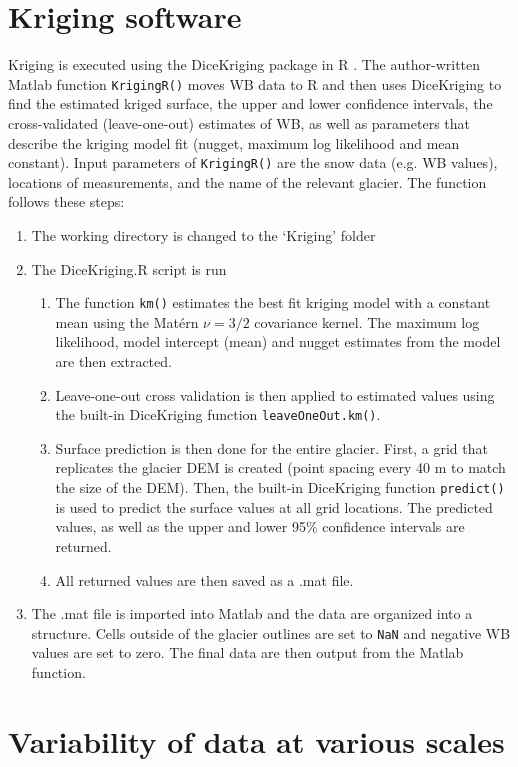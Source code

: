\documentclass{sfuthesis}
\begin{document}
\begin{appendices}
\chapter{Kriging software}
\label{app:KrigingMethods}
Kriging is executed using the DiceKriging package in R \citep{Roustant2012}. The author-written Matlab function \texttt{KrigingR()} moves WB data to R and then uses DiceKriging to find the estimated kriged surface, the upper and lower confidence intervals, the cross-validated (leave-one-out) estimates of WB, as well as parameters that describe the kriging model fit (nugget, maximum log likelihood and mean constant). Input parameters of  \texttt{KrigingR()} are the snow data (e.g. WB values), locations of measurements, and the name of the relevant glacier. The function follows these steps:
\begin{enumerate}
\item The working directory is changed to the `Kriging' folder
\item The DiceKriging.R script is run
	\begin{enumerate}
	\item The function \texttt{km()} estimates the best fit kriging model with a constant mean using the Mat\'ern $\nu = 3/2$ covariance kernel. The maximum log likelihood, model intercept (mean) and nugget estimates from the model are then extracted. 
	\item Leave-one-out cross validation is then applied to estimated values using the built-in DiceKriging function \texttt{leaveOneOut.km()}.
	\item Surface prediction is then done for the entire glacier. First, a grid that replicates the glacier DEM is created (point spacing every 40 m to match the size of the DEM). Then, the built-in DiceKriging function \texttt{predict()} is used to predict the surface values at all grid locations. The predicted values, as well as the upper and lower 95\% confidence intervals are returned. 
	\item All returned values are then saved as a .mat file.
	\end{enumerate}
\item The .mat file is imported into Matlab and the data are organized into a structure. Cells outside of the glacier outlines are set to \texttt{NaN} and negative WB values are set to zero. The final data are then output from the Matlab function. 
\end{enumerate}

\chapter{Variability of data at various scales}


\end{appendices}
\end{document}
